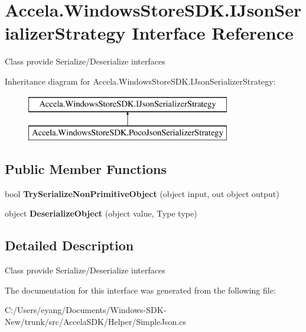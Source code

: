 \hypertarget{interface_accela_1_1_windows_store_s_d_k_1_1_i_json_serializer_strategy}{\section{Accela.\+Windows\+Store\+S\+D\+K.\+I\+Json\+Serializer\+Strategy Interface Reference}
\label{interface_accela_1_1_windows_store_s_d_k_1_1_i_json_serializer_strategy}
}


Class provide Serialize/\+Deserialize interfaces  


Inheritance diagram for Accela.\+Windows\+Store\+S\+D\+K.\+I\+Json\+Serializer\+Strategy\+:\begin{figure}[H]
\begin{center}
\leavevmode
\includegraphics[height=2.000000cm]{interface_accela_1_1_windows_store_s_d_k_1_1_i_json_serializer_strategy}
\end{center}
\end{figure}
\subsection*{Public Member Functions}
\begin{DoxyCompactItemize}
\item 
\hypertarget{interface_accela_1_1_windows_store_s_d_k_1_1_i_json_serializer_strategy_a6ec6eef59acb4078124183f715631737}{bool {\bfseries Try\+Serialize\+Non\+Primitive\+Object} (object input, out object output)}\label{interface_accela_1_1_windows_store_s_d_k_1_1_i_json_serializer_strategy_a6ec6eef59acb4078124183f715631737}

\item 
\hypertarget{interface_accela_1_1_windows_store_s_d_k_1_1_i_json_serializer_strategy_aa845640405e5c54be49324448f40b023}{object {\bfseries Deserialize\+Object} (object value, Type type)}\label{interface_accela_1_1_windows_store_s_d_k_1_1_i_json_serializer_strategy_aa845640405e5c54be49324448f40b023}

\end{DoxyCompactItemize}


\subsection{Detailed Description}
Class provide Serialize/\+Deserialize interfaces 



The documentation for this interface was generated from the following file\+:\begin{DoxyCompactItemize}
\item 
C\+:/\+Users/eyang/\+Documents/\+Windows-\/\+S\+D\+K-\/\+New/trunk/src/\+Accela\+S\+D\+K/\+Helper/Simple\+Json.\+cs\end{DoxyCompactItemize}

